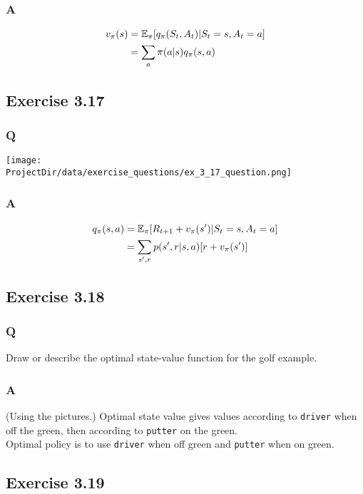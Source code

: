 \subsubsection*{A}
\begin{align*}
    v_\pi(s) & = \mathbb{E}_{\pi}[q_\pi(S_t, A_t) |S_t = s, A_t = a] \\ 
          & = \sum_a \pi(a|s) q_\pi(s, a)
\end{align*}

\subsection{Exercise 3.17}
\subsubsection*{Q}
\texttt{[image: \\ProjectDir/data/exercise\_questions/ex\_3\_17\_question.png]}
 
\subsubsection*{A} 
\begin{align*}
    q_\pi(s, a) & = \mathbb{E}_{\pi}[R_{t+1} + v_\pi(s') |S_t = s, A_t = a] \\ 
          & = \sum_{s', r} p(s', r|s, a) [r + v_\pi(s')]
\end{align*}


\subsection{Exercise 3.18}
\subsubsection*{Q}
Draw or describe the optimal state-value function for the golf example.

\subsubsection*{A}
(Using the pictures.) Optimal state value gives values according to \texttt{driver} when off the green, then according to \texttt{putter} on the green.\\

Optimal policy is to use \texttt{driver} when off green and \texttt{putter} when on green.
 
 
\subsection{Exercise 3.19}
